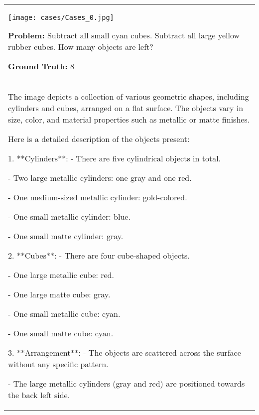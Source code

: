 \begin{table*}[htbp]
    \centering
    \renewcommand{\arraystretch}{1.2} 
    \setlength{\tabcolsep}{8pt} 
    \begin{tabular}{p{14cm}}
        \centering
        \texttt{[image: cases/Cases\_0.jpg]}
        
        \begin{tcolorbox}[colback=gray!5, colframe=gray!40, sharp corners, width=\linewidth, boxrule=0.5mm]
        \small
        \textbf{Problem: }
        Subtract all small cyan cubes. Subtract all large yellow rubber cubes. How many objects are left?

        \textbf{Ground Truth:} 8
        \end{tcolorbox}  %
        \begin{tcolorbox}[colback=gray!5, colframe=gray!40, sharp corners, width=\linewidth, boxrule=0.5mm]
            \small
            \textbf{ViFT With Vision-Text Inputs}
            \\
The image depicts a collection of various geometric shapes, including cylinders and cubes, arranged on a flat surface. The objects vary in size, color, and material properties such as metallic or matte finishes.

Here is a detailed description of the objects present:

1. **Cylinders**:
   - There are five cylindrical objects in total.
   
   - Two large metallic cylinders: one gray and one red.
   
   - One medium-sized metallic cylinder: gold-colored.
   
   - One small metallic cylinder: blue.
   
   - One small matte cylinder: gray.

2. **Cubes**:
   - There are four cube-shaped objects.
   
   - One large metallic cube: red.
   
   - One large matte cube: gray.
   
   - One small metallic cube: cyan.
   
   - One small matte cube: cyan.

3. **Arrangement**:
   - The objects are scattered across the surface without any specific pattern.
   
   - The large metallic cylinders (gray and red) are positioned towards the back left side.
   

\end{tcolorbox}
\end{tabular}
\end{table*}
